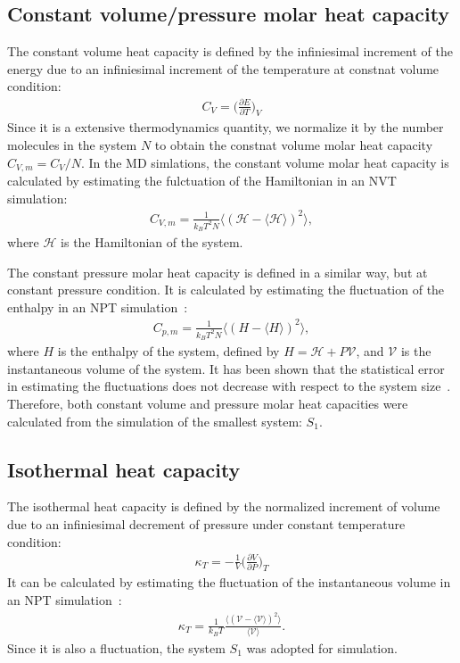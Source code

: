 \documentclass[aip,jcp,a4paper,preprint,unsortedaddress,onecolumn,fleqn]{revtex4-1}
\newcommand{\systemsb}{S_1}
\begin{document}
\subsection{Constant volume/pressure molar heat capacity}

The constant volume heat capacity is defined by the infiniesimal
increment of the energy due to an infiniesimal increment of the temperature
at constnat volume condition: 
\begin{align}
  C_V = \Big(\frac{\partial E}{\partial T}\Big)_V
\end{align}
Since it is a extensive thermodynamics quantity, we  normalize
it by the number molecules in the system $N$ to obtain the
constnat volume molar heat capacity $C_{V,m} = C_V/N$.
In the MD simlations, 
the constant volume molar heat capacity is calculated by estimating the
fulctuation of the Hamiltonian in an NVT simulation:
\begin{align}
  C_{V,m} = \frac{1}{k_BT^2 N} \langle (\mathcal H - \langle\mathcal H\rangle)^2 \rangle,
\end{align}
where $\mathcal H$ is the 
Hamiltonian of the system. 

The constant pressure molar heat capacity is defined in
a similar way, but at constant pressure
condition. 
It is calculated by estimating
the fluctuation of the enthalpy in an NPT simulation~\cite{wang2011existence}:
\begin{align}
  C_{p,m} = \frac{1}{k_BT^2 N} \langle ( H - \langle H\rangle)^2 \rangle,
\end{align}
where $ H$ is the enthalpy of the system,
defined by $H = \mathcal H + P\mathcal V$, and $\mathcal V$ is the instantaneous volume
of the system.
It has been shown that the statistical error in estimating
the fluctuations does not decrease with
respect to the system size~\cite{milchev1986fluctuations,ferrenberg1991statistical}.
Therefore, both constant volume and pressure molar heat capacities
were calculated from the simulation of the smallest system: $\systemsb$.

\subsection{Isothermal heat capacity}
The isothermal heat capacity is defined
by the normalized increment of volume due to an infiniesimal
decrement of pressure under constant temperature condition:
\begin{align}
  \kappa_T = - \frac 1V \Big(\frac{\partial V}{\partial P}\Big)_T
\end{align}
It can be calculated by estimating the fluctuation
of the instantaneous volume in an NPT simulation~\cite{wang2011existence}:
\begin{align}
  \kappa_T = \frac{1}{k_BT} \frac{\langle (\mathcal V - \langle \mathcal V\rangle)^2 \rangle}{\langle \mathcal V\rangle}.
\end{align}
Since it is also a fluctuation, the system $\systemsb$ was adopted for simulation.
\end{document}
